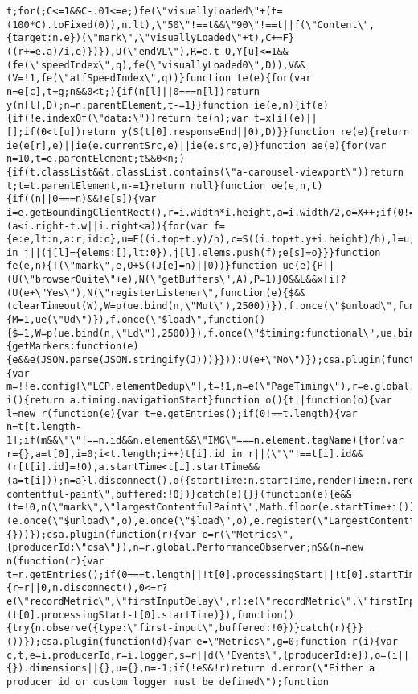 \documentclass[
]{article}
\begin{document}
\begin{verbatim}
t;for(;C<=1&&C-.01<=e;)fe(\"visuallyLoaded\"+(t=(100*C).toFixed(0)),n.lt),\"50\"!==t&&\"90\"!==t||f(\"Content\",{target:n.e})(\"mark\",\"visuallyLoaded\"+t),C+=F}((r+=e.a)/i,e)})}),U(\"endVL\"),R=e.t-O,Y[u]<=1&&(fe(\"speedIndex\",q),fe(\"visuallyLoaded0\",D)),V&&(V=!1,fe(\"atfSpeedIndex\",q))}function te(e){for(var n=e[c],t=g;n&&0<t;){if(n[l]||0===n[l])return y(n[l],D);n=n.parentElement,t-=1}}function ie(e,n){if(e){if(!e.indexOf(\"data:\"))return te(n);var t=x[i](e)||[];if(0<t[u])return y(S(t[0].responseEnd||0),D)}}function re(e){return ie(e[r],e)||ie(e.currentSrc,e)||ie(e.src,e)}function ae(e){for(var n=10,t=e.parentElement;t&&0<n;){if(t.classList&&t.classList.contains(\"a-carousel-viewport\"))return t;t=t.parentElement,n-=1}return null}function oe(e,n,t){if((n||0===n)&&!e[s]){var i=e.getBoundingClientRect(),r=i.width*i.height,a=i.width/2,o=X++;if(0!=r&&!(a<i.right-t.w||i.right<a)){for(var f={e:e,lt:n,a:r,id:o},u=E((i.top+t.y)/h),c=S((i.top+t.y+i.height)/h),l=u;l<=c;l++)l in j||(j[l]={elems:[],lt:0}),j[l].elems.push(f);e[s]=o}}}function fe(e,n){T(\"mark\",e,O+S((J[e]=n)||0))}function ue(e){P||(U(\"browserQuite\"+e),N(\"getBuffers\",A),P=1)}O&&L&&x[i]?(U(e+\"Yes\"),N(\"registerListener\",function(e){$&&(clearTimeout(W),W=p(ue.bind(n,\"Mut\"),2500))}),f.once(\"$unload\",function(){M=1,ue(\"Ud\")}),f.once(\"$load\",function(){$=1,W=p(ue.bind(n,\"Ld\"),2500)}),f.once(\"$timing:functional\",ue.bind(n,\"Fn\")),f.register(\"SpeedIndex\",{getMarkers:function(e){e&&e(JSON.parse(JSON.stringify(J)))}})):U(e+\"No\")});csa.plugin(function(e){var m=!!e.config[\"LCP.elementDedup\"],t=!1,n=e(\"PageTiming\"),r=e.global.PerformanceObserver,a=e.global.performance;function i(){return a.timing.navigationStart}function o(){t||function(o){var l=new r(function(e){var t=e.getEntries();if(0!==t.length){var n=t[t.length-1];if(m&&\"\"!==n.id&&n.element&&\"IMG\"===n.element.tagName){for(var r={},a=t[0],i=0;i<t.length;i++)t[i].id in r||(\"\"!==t[i].id&&(r[t[i].id]=!0),a.startTime<t[i].startTime&&(a=t[i]));n=a}l.disconnect(),o({startTime:n.startTime,renderTime:n.renderTime,loadTime:n.loadTime})}});try{l.observe({type:\"largest-contentful-paint\",buffered:!0})}catch(e){}}(function(e){e&&(t=!0,n(\"mark\",\"largestContentfulPaint\",Math.floor(e.startTime+i())),e.renderTime&&n(\"mark\",\"largestContentfulPaint.render\",Math.floor(e.renderTime+i())),e.loadTime&&n(\"mark\",\"largestContentfulPaint.load\",Math.floor(e.loadTime+i())))})}r&&a&&a.timing&&(e.once(\"$unload\",o),e.once(\"$load\",o),e.register(\"LargestContentfulPaint\",{}))});csa.plugin(function(r){var e=r(\"Metrics\",{producerId:\"csa\"}),n=r.global.PerformanceObserver;n&&(n=new n(function(r){var t=r.getEntries();if(0===t.length||!t[0].processingStart||!t[0].startTime)return;!function(r){r=r||0,n.disconnect(),0<=r?e(\"recordMetric\",\"firstInputDelay\",r):e(\"recordMetric\",\"firstInputDelay.invalid\",1)}(t[0].processingStart-t[0].startTime)}),function(){try{n.observe({type:\"first-input\",buffered:!0})}catch(r){}}())});csa.plugin(function(d){var e=\"Metrics\",g=0;function r(i){var c,t,e=i.producerId,r=i.logger,s=r||d(\"Events\",{producerId:e}),o=(i||{}).dimensions||{},u={},n=-1;if(!e&&!r)return d.error(\"Either a producer id or custom logger must be defined\");function 
\end{verbatim}
\end{document}
